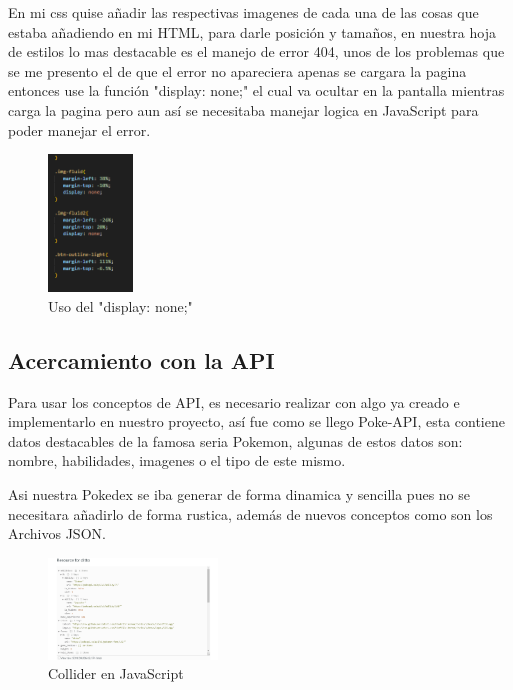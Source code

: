 \documentclass[conference]{IEEEtran}
\begin{document}
En mi css quise añadir las respectivas imagenes de cada una de las cosas que estaba añadiendo en mi HTML, para darle posición y tamaños, en nuestra hoja de estilos lo mas destacable es el manejo de error 404, unos de los problemas que se me presento el de que el error no apareciera apenas se cargara la pagina entonces use la función "display: none;" el cual va ocultar en la pantalla mientras carga la pagina pero aun así se necesitaba manejar logica en JavaScript para poder manejar el error.

\begin{figure}[h] %
    \centering
    \includegraphics[width=0.2\textwidth]{images/Manejo del error 404.png} %
    \caption{Uso del "display: none;" }
    \label{fig:mi_imagen}
\end{figure}
\subsection{Acercamiento con la API}
Para usar los conceptos de API, es necesario realizar con algo ya creado e implementarlo en nuestro proyecto, así fue como se llego Poke-API, esta contiene datos destacables de la famosa seria Pokemon, algunas de estos datos son: nombre, habilidades, imagenes o el tipo de este mismo. 

Asi nuestra Pokedex se iba generar de forma dinamica y sencilla pues no se necesitara añadirlo de forma rustica, además de nuevos conceptos como son los Archivos JSON. 

\begin{figure}[h] %
    \centering
    \includegraphics[width=0.4\textwidth]{images/API.png} %
    \caption{Collider en JavaScript}
    \label{fig:mi_imagen}
\end{figure}
\end{document}
